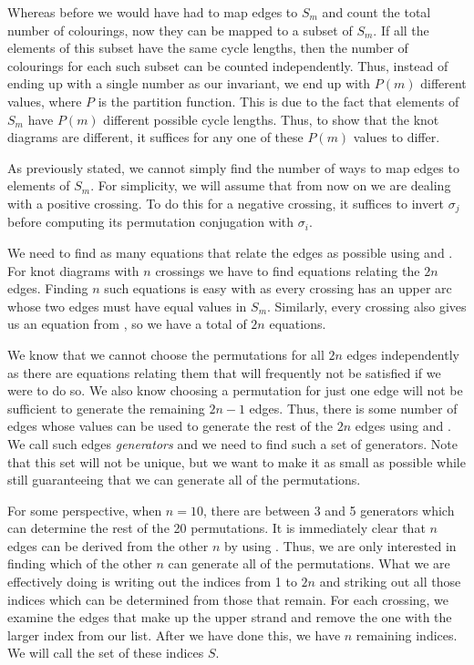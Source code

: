 \begin{paper}
Whereas before we would have had to map edges to $S_m$ and count the total
number of colourings, now they can be mapped to a subset of $S_m$.
If all the elements of this subset have the same cycle lengths, then the number
of colourings for each such subset can be counted independently.
Thus, instead of ending up with a single number as our invariant, we end up with
$P(m)$ different values, where $P$ is the partition function.
This is due to the fact that elements of $S_m$ have $P(m)$ different possible
cycle lengths.
Thus, to show that the knot diagrams are different, it suffices for any one of
these $P(m)$ values to differ.

As previously stated, we cannot simply find the number of ways to map edges to
elements of $S_m$.
For simplicity, we will assume that from now on we are dealing with a positive
crossing.
To do this for a negative crossing, it suffices to invert $\sigma_j$ before
computing its permutation conjugation with $\sigma_i$.

We need to find as many equations that relate the edges as possible using
\eqUpper and \eqPositive.
For knot diagrams with $n$ crossings we have to find equations relating the $2n$
edges.
Finding $n$ such equations is easy with \eqUpper as every crossing has an upper
arc whose two edges must have equal values in $S_m$.
Similarly, every crossing also gives us an equation from \eqRight, so we have a
total of $2n$ equations.

We know that we cannot choose the permutations for all $2n$ edges independently
as there are equations relating them that will frequently not be satisfied if we
were to do so.
We also know choosing a permutation for just one edge will not be sufficient to
generate the remaining $2n-1$ edges.
Thus, there is some number of edges whose values can be used to generate the
rest of the $2n$ edges using \eqUpper and \eqRight.
We call such edges \textit{generators} and we need to find such a set of
generators.
Note that this set will not be unique, but we want to make it as small as
possible while still guaranteeing that we can generate all of the permutations.

For some perspective, when $n=10$, there are between 3 and 5 generators which
can determine the rest of the 20 permutations.
It is immediately clear that $n$ edges can be derived from the other $n$ by
using \eqUpper.
Thus, we are only interested in finding which of the other $n$ can generate all
of the permutations.
What we are effectively doing is writing out the indices from 1 to $2n$ and
striking out all those indices which can be determined from those that remain.
For each crossing, we examine the edges that make up the upper strand and remove
the one with the larger index from our list.
After we have done this, we have $n$ remaining indices.
We will call the set of these indices $S$.


\end{paper}
